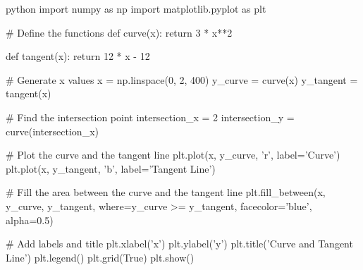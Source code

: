 python
import numpy as np
import matplotlib.pyplot as plt

# Define the functions
def curve(x):
    return 3 * x**2

def tangent(x):
    return 12 * x - 12

# Generate x values
x = np.linspace(0, 2, 400)
y_curve = curve(x)
y_tangent = tangent(x)

# Find the intersection point
intersection_x = 2
intersection_y = curve(intersection_x)

# Plot the curve and the tangent line
plt.plot(x, y_curve, 'r', label='Curve')
plt.plot(x, y_tangent, 'b', label='Tangent Line')

# Fill the area between the curve and the tangent line
plt.fill_between(x, y_curve, y_tangent, where=y_curve >= y_tangent, facecolor='blue', alpha=0.5)

# Add labels and title
plt.xlabel('x')
plt.ylabel('y')
plt.title('Curve and Tangent Line')
plt.legend()
plt.grid(True)
plt.show()